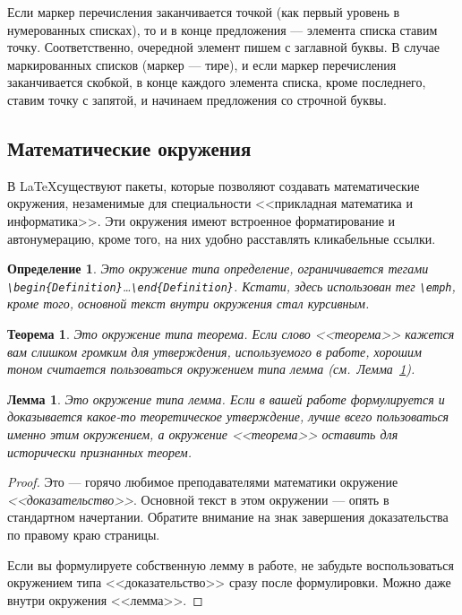 \documentclass[14pt, russian]{scrartcl}
\newcounter{cTheorem}
\newcounter{cDefinition}
\newcounter{cLemma}
\newtheorem{Theorem}{Теорема}[cTheorem]
\newtheorem{Definition}{Определение}[cDefinition]
\newtheorem{Lemma}{Лемма}[cLemma]
\begin{document}
Если маркер перечисления заканчивается точкой (как первый уровень в нумерованных списках), то и в конце предложения --- элемента списка ставим точку. Соответственно, очередной элемент пишем с заглавной буквы. В случае маркированных списков (маркер --- тире), и если маркер перечисления заканчивается скобкой, в конце каждого элемента списка, кроме последнего, ставим точку с запятой, и начинаем предложения со строчной буквы.

\subsection{Математические окружения}\label{Sect::MathEnv}

В \LaTeX существуют пакеты, которые позволяют создавать математические окружения, незаменимые для специальности <<прикладная математика и информатика>>. Эти окружения имеют встроенное форматирование и автонумерацию, кроме того, на них удобно расставлять кликабельные ссылки.

\begin{Definition}
Это окружение типа \emph{определение}, ограничивается тегами \texttt{\textbackslash begin\{Definition\}}\dots \texttt{\textbackslash end\{Definition\}}. Кстати, здесь использован тег \texttt{\textbackslash emph}, кроме того, основной текст внутри окружения стал курсивным.
\end{Definition} 

\begin{Theorem}
Это окружение типа \emph{теорема}. Если слово <<теорема>> кажется вам слишком громким для утверждения, используемого в работе, хорошим тоном считается пользоваться окружением типа лемма (см.~Лемма~\ref{Lemma::Lemma}).
\end{Theorem} 

\begin{Lemma}\label{Lemma::Lemma}
Это окружение типа \emph{лемма}. Если в вашей работе формулируется и доказывается какое-то теоретическое утверждение, лучше всего пользоваться именно этим окружением, а окружение <<теорема>> оставить для исторически признанных теорем.
\end{Lemma} 

\begin{proof}
Это --- горячо любимое преподавателями математики окружение \emph{<<доказательство>>}. Основной текст в этом окружении --- опять в стандартном начертании. Обратите внимание на знак завершения доказательства по правому краю страницы.

Если вы формулируете собственную лемму в работе, не забудьте воспользоваться окружением типа <<доказательство>> сразу после формулировки. Можно даже внутри окружения <<лемма>>.
\end{proof}
\end{document}
